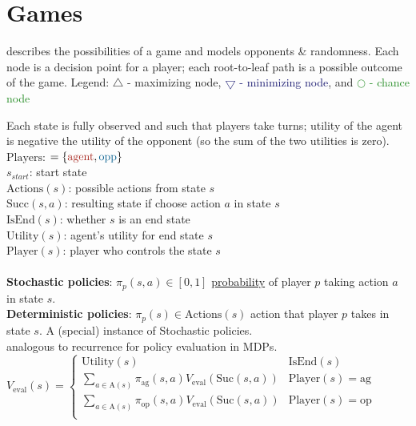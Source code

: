 \newcommand{\agentcolor}[1]{\textcolor{Mahogany}{#1}}
\newcommand{\oppcolor}[1]{\textcolor{MidnightBlue}{#1}}
\newcommand{\chancecolor}[1]{\textcolor{ForestGreen}{#1}}
\newcommand{\dcolor}[1]{\textcolor{Fuchsia}{#1}}

\section{Games}

 describes the possibilities of a game and models opponents \&
randomness. Each node is a decision point for a player; each root-to-leaf path
is a possible outcome of the game.  Legend: \agentcolor{$\bigtriangleup$ -
maximizing node}, \oppcolor{$\bigtriangledown$ - minimizing node}, and
\chancecolor{$\bigcirc$ - chance node}

 Each state is fully observed and such that
players take turns; utility of the agent is negative the utility of the opponent
(so the sum of the two utilities is zero).\\
\textbf{$\text{Players}$}: $ = \{\agentcolor{\text{agent}}, \oppcolor{\text{opp}}\}$\\
\textbf{$s_{start}$}: start state\\
\textbf{$\text{Actions}(s)$}: possible actions from state $s$\\
\textbf{$\text{Succ}(s, a)$}: resulting state if choose action $a$ in state $s$\\
\textbf{$\text{IsEnd}(s)$}: whether $s$ is an end state\\
\textbf{$\text{Utility}(s)$}: agent's utility for end state $s$\\
\textbf{$\text{Player}(s)$}: player who controls the state $s$\\

\\
\textbf{Stochastic policies}: $\pi_{p}(s, a) \in \left[0, 1\right]$
\underline{probability} of player $p$ taking action $a$ in state $s$.\\
\textbf{Deterministic policies}: $\pi_{p}(s) \in \text{Actions}(s)$ action that
player $p$ takes in state $s$. A (special) instance of Stochastic policies.\\

 analogous to recurrence for policy evaluation in MDPs.
$V_{\text{eval}}(s) = \begin{cases}
    \text{Utility}(s) & \text{IsEnd}(s) \\
    \sum_{a \in \text{A}(s)} \pi_{\text{ag}}(s, a) V_{\text{eval}}(\text{Suc}(s, a)) & \text{Player}(s) = \text{ag} \\
    \sum_{a \in \text{A}(s)} \pi_{\text{op}}(s, a) V_{\text{eval}}(\text{Suc}(s, a)) & \text{Player}(s) = \text{op} \\
\end{cases}$

